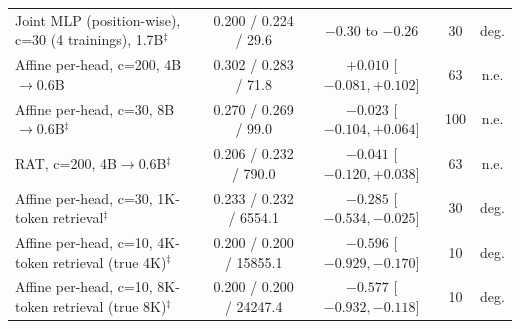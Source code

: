 \documentclass[10pt]{article}
\begin{document}
\begin{table}[t]
\begin{tabular}{lcccc}
Joint MLP (position-wise), c=30 (4 trainings), 1.7B$^\ddagger$ & 0.200 / 0.224 / 29.6 & $-0.30$ to $-0.26$ & 30 & deg. \\
Affine per-head, c=200, 4B$\to$0.6B & 0.302 / 0.283 / 71.8 & $+0.010$ [$-0.081, +0.102$] & 63 & n.e. \\
Affine per-head, c=30, 8B$\to$0.6B$^\ddagger$ & 0.270 / 0.269 / 99.0 & $-0.023$ [$-0.104, +0.064$] & 100 & n.e. \\
RAT, c=200, 4B$\to$0.6B$^\ddagger$ & 0.206 / 0.232 / 790.0 & $-0.041$ [$-0.120, +0.038$] & 63 & n.e. \\
Affine per-head, c=30, 1K-token retrieval$^\ddagger$ & 0.233 / 0.232 / 6554.1 & $-0.285$ [$-0.534, -0.025$] & 30 & deg. \\
Affine per-head, c=10, 4K-token retrieval (true 4K)$^\ddagger$ & 0.200 / 0.200 / 15855.1 & $-0.596$ [$-0.929, -0.170$] & 10 & deg. \\
Affine per-head, c=10, 8K-token retrieval (true 8K)$^\ddagger$ & 0.200 / 0.200 / 24247.4 & $-0.577$ [$-0.932, -0.118$] & 10 & deg. \\
\bottomrule
\end{tabular}
\end{table}
\end{document}
